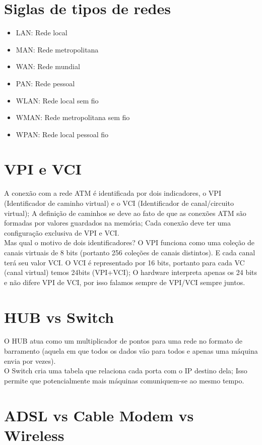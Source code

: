 \documentclass{article}
\begin{document}
\section{Siglas de tipos de redes}

\begin{itemize}
	\item LAN: Rede local
	\item MAN: Rede metropolitana
	\item WAN: Rede mundial
	\item PAN: Rede pessoal
	\item WLAN: Rede local sem fio
	\item WMAN: Rede metropolitana sem fio
	\item WPAN: Rede local pessoal fio
\end{itemize}

\section{VPI e VCI}
A conexão com a rede ATM é identificada por dois indicadores, o VPI
(Identificador de caminho virtual) e o VCI (Identificador de canal/circuito virtual); A
definição de caminhos se deve ao fato de que as conexões ATM são formadas por
valores guardados na memória; Cada conexão deve ter uma configuração exclusiva de VPI e VCI.\\
Mas qual o motivo de dois identificadores? O VPI funciona como uma coleção de
canais virtuais de 8 bits (portanto 256 coleções de canais distintos). E cada
canal terá seu valor VCI. O VCI é representado por 16 bits, portanto para cada
VC (canal virtual) temos 24bits (VPI+VCI); O hardware interpreta apenas os 24
bits e não difere VPI de VCI, por isso falamos sempre de VPI/VCI sempre juntos.

\section{HUB vs Switch}
O HUB atua como um multiplicador de pontos para uma rede no formato de barramento
(aquela em que todos os dados vão para todos e apenas uma máquina envia por
vezes).\\
O Switch cria uma tabela que relaciona cada porta com o IP destino dela; Isso
permite que potencialmente mais máquinas comuniquem-se ao mesmo tempo.

\section{ADSL vs Cable Modem vs Wireless}
\end{document}
